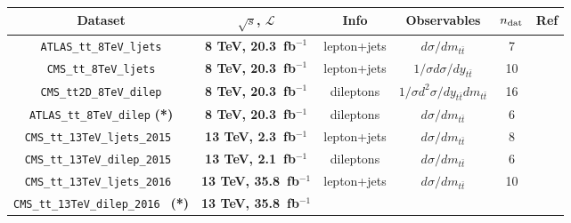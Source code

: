 \begin{table}[t]
  \centering
  \scriptsize
   \renewcommand{\arraystretch}{1.80}
  \begin{tabular}{c|c|c|c|c|c}
 Dataset   &  $\sqrt{s}$, $\mathcal{L}$  & Info  &  Observables  & $n_{\rm dat}$ & Ref   \\
    \toprule
      {\tt ATLAS\_tt\_8TeV\_ljets}
      & { \bf 8 TeV, 20.3~fb$^{-1}$}
      & lepton+jets
      & $d\sigma/dm_{t\bar{t}}$
      & 7
      & \cite{Aad:2015mbv} \\
    \midrule
      {\tt CMS\_tt\_8TeV\_ljets}
      & {\bf 8 TeV, 20.3~fb$^{-1}$}
      & lepton+jets
      & $1/\sigma d\sigma/dy_{t\bar{t}}$
      & 10
      & \cite{Khachatryan:2015oqa} \\
    \midrule
      {\tt CMS\_tt2D\_8TeV\_dilep}
      & {\bf 8 TeV, 20.3~fb$^{-1}$}
      & dileptons
      & $1/\sigma d^2\sigma/dy_{t\bar{t}}dm_{t\bar{t}}$
      & 16
      & \cite{Sirunyan:2017azo} \\
    \midrule
      {\tt ATLAS\_tt\_8TeV\_dilep} {\bf(*)}
      & {\bf 8 TeV, 20.3~fb$^{-1}$}
      & dileptons
      & $d\sigma/dm_{t\bar{t}}$
      & 6
      & \cite{Aaboud:2016iot}  \\
    \midrule
    \midrule
      {\tt CMS\_tt\_13TeV\_ljets\_2015 }
      & {\bf 13 TeV, 2.3~fb$^{-1}$}
      & lepton+jets
      & $d\sigma/dm_{t\bar{t}}$
      & 8
      & \cite{Khachatryan:2016mnb}  \\
    \midrule
      {\tt CMS\_tt\_13TeV\_dilep\_2015 }
      & {\bf 13 TeV, 2.1~fb$^{-1}$}
      & dileptons
      & $d\sigma/dm_{t\bar{t}}$
      & 6
      & \cite{Sirunyan:2017mzl}  \\
    \midrule
      {\tt CMS\_tt\_13TeV\_ljets\_2016 }
      & {\bf 13 TeV, 35.8~fb$^{-1}$}
      & lepton+jets
      & $d\sigma/dm_{t\bar{t}}$
      & 10
      & \cite{Sirunyan:2018wem}  \\
    \midrule
      {\tt CMS\_tt\_13TeV\_dilep\_2016 } {\bf(*)}
      & {\bf 13 TeV, 35.8~fb$^{-1}$}

\end{tabular}
\end{table}
